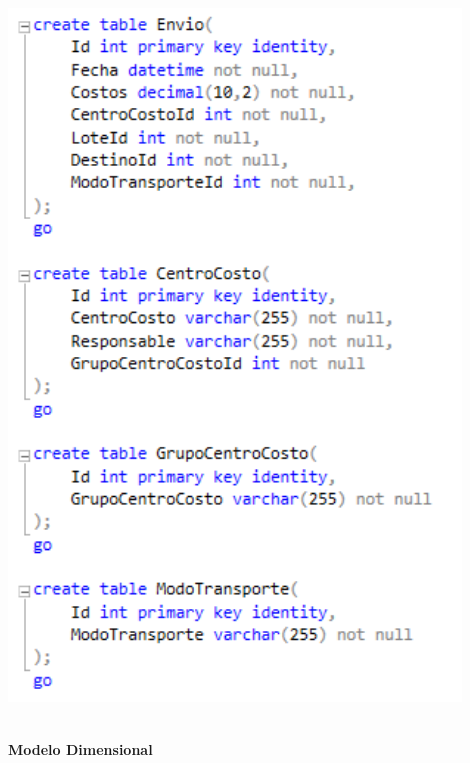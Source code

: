 \begin{center}
\includegraphics[width=12cm]{./Imagenes/12}
\end{center}
\\
\textbf{Modelo Dimensional}
